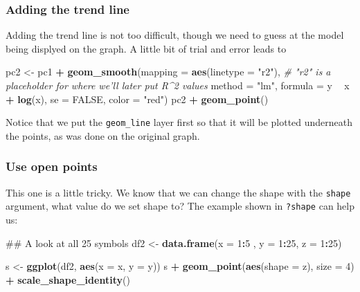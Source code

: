 \documentclass[]{book}
\newenvironment{Shaded}{\begin{snugshade}}{\end{snugshade}}
\newcommand{\KeywordTok}[1]{\textcolor[rgb]{0.13,0.29,0.53}{\textbf{#1}}}
\newcommand{\DataTypeTok}[1]{\textcolor[rgb]{0.13,0.29,0.53}{#1}}
\newcommand{\DecValTok}[1]{\textcolor[rgb]{0.00,0.00,0.81}{#1}}
\newcommand{\StringTok}[1]{\textcolor[rgb]{0.31,0.60,0.02}{#1}}
\newcommand{\CommentTok}[1]{\textcolor[rgb]{0.56,0.35,0.01}{\textit{#1}}}
\newcommand{\OtherTok}[1]{\textcolor[rgb]{0.56,0.35,0.01}{#1}}
\newcommand{\OperatorTok}[1]{\textcolor[rgb]{0.81,0.36,0.00}{\textbf{#1}}}
\newcommand{\NormalTok}[1]{#1}
\begin{document}
\subsubsection{Adding the trend line}\label{adding-the-trend-line}

Adding the trend line is not too difficult, though we need to guess at
the model being displyed on the graph. A little bit of trial and error
leads to

\begin{Shaded}
\begin{Highlighting}[]
\NormalTok{pc2 <-}\StringTok{ }\NormalTok{pc1 }\OperatorTok{+}
\StringTok{  }\KeywordTok{geom_smooth}\NormalTok{(}\DataTypeTok{mapping =} \KeywordTok{aes}\NormalTok{(}\DataTypeTok{linetype =} \StringTok{"r2"}\NormalTok{),   }\CommentTok{# "r2" is a placeholder for where we'll later put R^2 values}
              \DataTypeTok{method =} \StringTok{"lm"}\NormalTok{,}
              \DataTypeTok{formula =}\NormalTok{ y }\OperatorTok{~}\StringTok{ }\NormalTok{x }\OperatorTok{+}\StringTok{ }\KeywordTok{log}\NormalTok{(x), }\DataTypeTok{se =} \OtherTok{FALSE}\NormalTok{,}
              \DataTypeTok{color =} \StringTok{"red"}\NormalTok{)}
\NormalTok{pc2 }\OperatorTok{+}\StringTok{ }\KeywordTok{geom_point}\NormalTok{()}
\end{Highlighting}
\end{Shaded}

Notice that we put the \texttt{geom\_line} layer first so that it will
be plotted underneath the points, as was done on the original graph.

\subsubsection{Use open points}\label{use-open-points}

This one is a little tricky. We know that we can change the shape with
the \texttt{shape} argument, what value do we set shape to? The example
shown in \texttt{?shape} can help us:

\begin{Shaded}
\begin{Highlighting}[]
\NormalTok{## A look at all 25 symbols}
\NormalTok{df2 <-}\StringTok{ }\KeywordTok{data.frame}\NormalTok{(}\DataTypeTok{x =} \DecValTok{1}\OperatorTok{:}\DecValTok{5}\NormalTok{ , }\DataTypeTok{y =} \DecValTok{1}\OperatorTok{:}\DecValTok{25}\NormalTok{, }\DataTypeTok{z =} \DecValTok{1}\OperatorTok{:}\DecValTok{25}\NormalTok{)}

\NormalTok{s <-}\StringTok{ }\KeywordTok{ggplot}\NormalTok{(df2, }\KeywordTok{aes}\NormalTok{(}\DataTypeTok{x =}\NormalTok{ x, }\DataTypeTok{y =}\NormalTok{ y))}
\NormalTok{s }\OperatorTok{+}\StringTok{ }\KeywordTok{geom_point}\NormalTok{(}\KeywordTok{aes}\NormalTok{(}\DataTypeTok{shape =}\NormalTok{ z), }\DataTypeTok{size =} \DecValTok{4}\NormalTok{) }\OperatorTok{+}\StringTok{ }\KeywordTok{scale_shape_identity}\NormalTok{()}
\end{Highlighting}
\end{Shaded}
\end{document}
